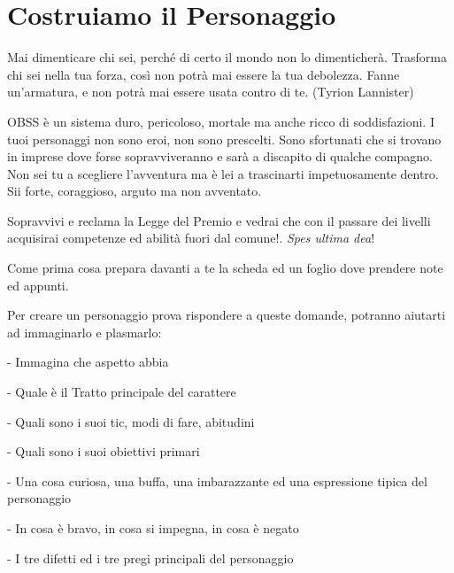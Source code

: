\section{Costruiamo il Personaggio}

\begin{enfasi}{
Mai dimenticare chi sei, perché di certo il mondo non lo dimenticherà. Trasforma chi sei nella tua forza, così non potrà mai essere la tua debolezza. Fanne un'armatura, e non potrà mai essere usata contro di te. (Tyrion Lannister)
}\end{enfasi}

\begin{multicols}{2}

OBSS è un sistema duro, pericoloso, mortale ma anche ricco di soddisfazioni. I tuoi personaggi non sono eroi, non sono prescelti. Sono sfortunati che si trovano in imprese dove forse sopravviveranno e sarà a discapito di qualche compagno. Non sei tu a scegliere l'avventura ma è lei a trascinarti impetuosamente dentro. Sii forte, coraggioso, arguto ma non avventato.

Sopravvivi e reclama la Legge del Premio e vedrai che con il passare dei livelli acquisirai competenze ed abilità fuori dal comune!. \emph{Spes ultima dea}!

Come prima cosa prepara davanti a te la scheda ed un foglio dove prendere note ed appunti.

Per creare un personaggio prova rispondere a queste domande, potranno aiutarti ad immaginarlo e plasmarlo:

- Immagina che aspetto abbia

- Quale è il Tratto principale del carattere

- Quali sono i suoi tic, modi di fare, abitudini

- Quali sono i suoi obiettivi primari

- Una cosa curiosa, una buffa, una imbarazzante ed una espressione tipica del personaggio

- In cosa è bravo, in cosa si impegna, in cosa è negato

- I tre difetti ed i tre pregi principali del personaggio

\begin{center}


\end{center}
\end{multicols}
